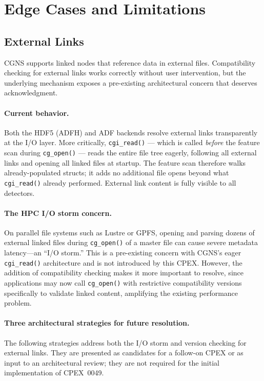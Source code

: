 \documentclass[11pt,letterpaper]{article}
\begin{document}
\section{Edge Cases and Limitations}

\subsection{External Links}

CGNS supports linked nodes that reference data in external files.
Compatibility checking for external links works correctly without
user intervention, but the underlying mechanism exposes a
pre-existing architectural concern that deserves acknowledgment.

\paragraph{Current behavior.}
Both the HDF5 (ADFH) and ADF backends resolve external links
transparently at the I/O layer.  More critically, \texttt{cgi\_read()}
--- which is called \emph{before} the feature scan during
\texttt{cg\_open()} --- reads the entire file tree eagerly, following
all external links and opening all linked files at startup.  The
feature scan therefore walks already-populated structs; it adds no
additional file opens beyond what \texttt{cgi\_read()} already
performed.  External link content is fully visible to all detectors.

\paragraph{The HPC I/O storm concern.}
On parallel file systems such as Lustre or GPFS, opening and parsing
dozens of external linked files during \texttt{cg\_open()} of a
master file can cause severe metadata latency---an ``I/O storm.''
This is a pre-existing concern with CGNS's eager \texttt{cgi\_read()}
architecture and is not introduced by this CPEX.  However, the
addition of compatibility checking makes it more important to resolve,
since applications may now call \texttt{cg\_open()} with restrictive
compatibility versions specifically to validate linked content, amplifying the
existing performance problem.

\paragraph{Three architectural strategies for future resolution.}
The following strategies address both the I/O storm and version
checking for external links.  They are presented as candidates for
a follow-on CPEX or as input to an architectural review; they are
not required for the initial implementation of CPEX~0049.
\end{document}
